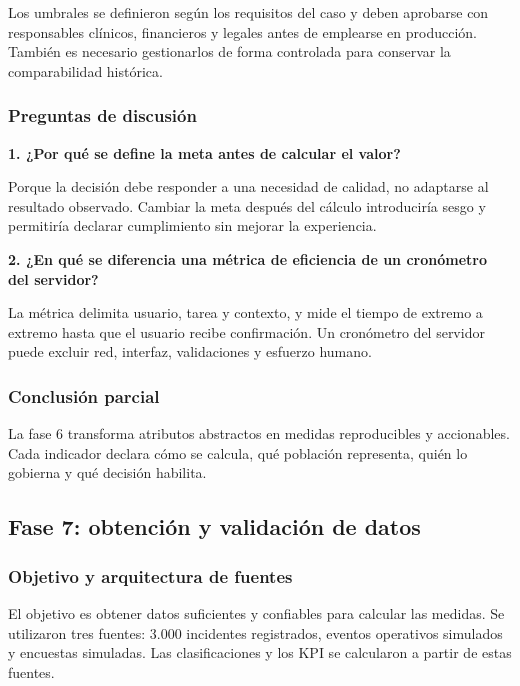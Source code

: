 Los umbrales se definieron según los requisitos del caso y deben aprobarse con responsables clínicos, financieros y legales antes de emplearse en producción. También es necesario gestionarlos de forma controlada para conservar la comparabilidad histórica.

\subsubsection{Preguntas de discusión}

\textbf{1. ¿Por qué se define la meta antes de calcular el valor?}

Porque la decisión debe responder a una necesidad de calidad, no adaptarse al resultado observado. Cambiar la meta después del cálculo introduciría sesgo y permitiría declarar cumplimiento sin mejorar la experiencia.

\textbf{2. ¿En qué se diferencia una métrica de eficiencia de un cronómetro del servidor?}

La métrica delimita usuario, tarea y contexto, y mide el tiempo de extremo a extremo hasta que el usuario recibe confirmación. Un cronómetro del servidor puede excluir red, interfaz, validaciones y esfuerzo humano.

\subsubsection{Conclusión parcial}

La fase 6 transforma atributos abstractos en medidas reproducibles y accionables. Cada indicador declara cómo se calcula, qué población representa, quién lo gobierna y qué decisión habilita.



\subsection{Fase 7: obtención y validación de datos}


\subsubsection{Objetivo y arquitectura de fuentes}

El objetivo es obtener datos suficientes y confiables para calcular las medidas. Se utilizaron tres fuentes: 3.000 incidentes registrados, eventos operativos simulados y encuestas simuladas. Las clasificaciones y los KPI se calcularon a partir de estas fuentes.

